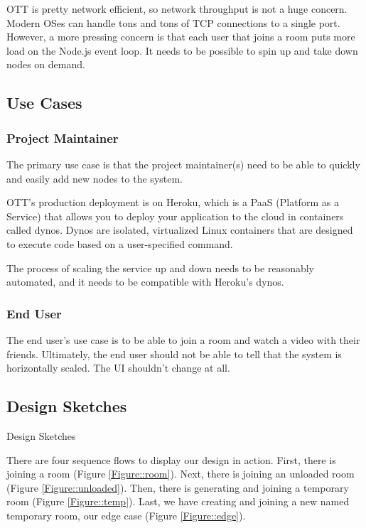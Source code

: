 OTT is pretty network efficient, so network throughput is not a huge concern. Modern OSes can handle tons and tons of TCP connections to a single port. However, a more pressing concern is that each user that joins a room puts more load on the Node.js event loop.
It needs to be possible to spin up and take down nodes on demand.

\subsection{Use Cases}

\subsubsection{Project Maintainer}

The primary use case is that the project maintainer(s) need to be able to quickly and easily add new nodes to the system.

OTT's production deployment is on Heroku, which is a PaaS (Platform as a Service) that allows you to deploy your application to the
cloud in containers called dynos. Dynos are isolated, virtualized Linux containers that are designed to execute code based on a
user-specified command.

The process of scaling the service up and down needs to be reasonably automated, and it needs to be compatible with Heroku's dynos.

\subsubsection{End User}

The end user's use case is to be able to join a room and watch a video with their friends. Ultimately, the end user should not be
able to tell that the system is horizontally scaled. The UI shouldn't change at all.

\subsection{Design Sketches}
Design Sketches

There are four sequence flows to display our design in action. First, there is joining a room (Figure \ref{Figure::room}). Next, there is joining an unloaded room (Figure \ref{Figure::unloaded}). Then, there is generating and joining a temporary room (Figure \ref{Figure::temp}). Last, we have creating and joining a new named temporary room, our edge case (Figure \ref{Figure::edge}).

